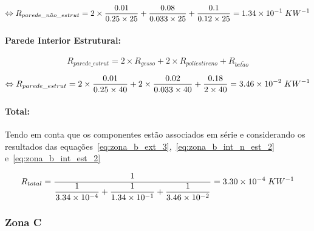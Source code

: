 \documentclass[12pt, a4paper]{article}
\begin{document}
\begin{equation}
	\Leftrightarrow R_{parede\_n\tilde{a}o\_estrut} =
	2 \times \dfrac{0.01}{0.25 \times 25} +
	\dfrac{0.08}{0.033 \times 25} +
	\dfrac{0.1}{0.12 \times 25} = 1.34 \times 10^{-1} \hspace{1mm} KW^{-1}
	\label{eq:zona_b_int_n_est_2}
\end{equation}

\paragraph{Parede Interior Estrutural:}\label{par:zona_b_int_est}

\begin{equation}
	R_{parede\_estrut} = 2 \times R_{gesso} + 2 \times R_{poliestireno} + R_{bet\tilde{a}o}
	\label{eq:zona_b_int_est_1}
\end{equation}

\begin{equation}
	\Leftrightarrow R_{parede\_estrut} =
		2 \times \dfrac{0.01}{0.25 \times 40} +
		2 \times \dfrac{0.02}{0.033 \times 40} +
		\dfrac{0.18}{2 \times 40}
		= 3.46 \times 10^{-2} \hspace{1mm} KW^{-1}
	\label{eq:zona_b_int_est_2}
\end{equation}


\paragraph{Total:}\label{par:zona_b_total} Tendo em conta que os componentes est\~ao
associados em série e considerando os resultados das
equa\c{c}\~oes~\ref*{eq:zona_b_ext_3},~\ref*{eq:zona_b_int_n_est_2} e~\ref*{eq:zona_b_int_est_2}

\begin{equation}
	R_{total} =
	\dfrac{1}{
		\dfrac{1}{
		3.34 \times 10^{-4} 
		} +
		\dfrac{1}{ 
		1.34 \times 10^{-1} 
		}+
		\dfrac{1}{ 
		3.46 \times 10^{-2} 
		}
	}
	= 3.30 \times 10^{-4} \hspace{1mm} KW^{-1}
	\label{eq:zona_b_total}
\end{equation}


\subsubsection{Zona C}\label{ssub:Zona C}
\end{document}
